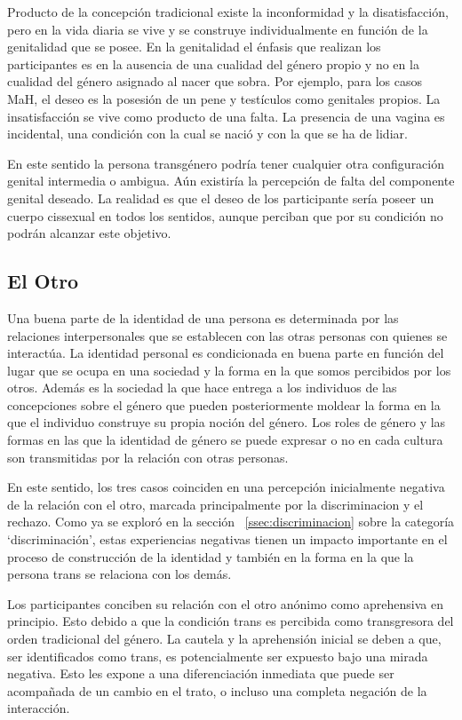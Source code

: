  Producto de la concepción tradicional existe la inconformidad y la
 disatisfacción, pero en la vida diaria se vive y se construye individualmente
 en función de la genitalidad que se posee. En la genitalidad el énfasis que
 realizan los participantes es en la ausencia de una cualidad del género propio
 y no en la cualidad del género asignado al nacer que sobra. Por ejemplo, para
 los casos MaH, el deseo es la posesión de un pene y testículos como genitales
 propios. La insatisfacción se vive como producto de una falta. La presencia de
 una vagina es incidental, una condición con la cual se nació y con la que se ha
 de lidiar.

 En este sentido la persona transgénero podría tener cualquier otra
 configuración genital intermedia o ambigua. Aún existiría la percepción de
 falta del componente genital deseado. La realidad es que el deseo de los
 participante sería poseer un cuerpo cissexual en todos los sentidos, aunque
 perciban que por su condición no podrán alcanzar este objetivo.

\subsection{El Otro}

Una buena parte de la identidad de una persona es determinada por las relaciones
interpersonales que se establecen con las otras personas con quienes se
interactúa. La identidad personal es condicionada en buena parte en función del
lugar que se ocupa en una sociedad y la forma en la que somos percibidos por los
otros. Además es la sociedad la que hace entrega a los individuos de las
concepciones sobre el género que pueden posteriormente moldear la forma en la
que el individuo construye su propia noción del género. Los roles de género y
las formas en las que la identidad de género se puede expresar o no en cada
cultura son transmitidas por la relación con otras personas.

En este sentido, los tres casos coinciden en una percepción inicialmente
negativa de la relación con el otro, marcada principalmente por la
discriminacion y el rechazo. Como ya se exploró en la sección
~\ref{ssec:discriminacion} sobre la categoría ‘discriminación’, estas
experiencias negativas tienen un impacto importante en el proceso de
construcción de la identidad y también en la forma en la que la persona trans se
relaciona con los demás.

Los participantes conciben su relación con el otro anónimo como aprehensiva en
principio. Esto debido a que la condición trans es percibida como transgresora
del orden tradicional del género. La cautela y la aprehensión inicial se deben a
que, ser identificados como trans, es potencialmente ser expuesto bajo una
mirada negativa. Esto les expone a una diferenciación inmediata que puede ser
acompañada de un cambio en el trato, o incluso una completa negación de la
interacción.


